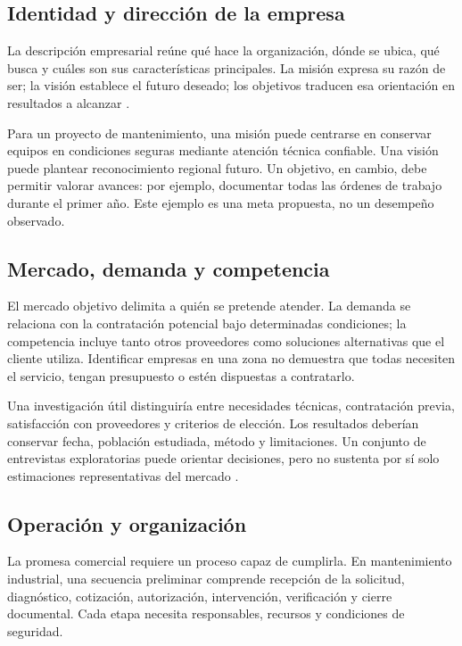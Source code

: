 {\subsection{Identidad y dirección de la empresa}

La descripción empresarial reúne qué hace la organización, dónde se ubica, qué busca y cuáles son sus características principales. La misión expresa su razón de ser; la visión establece el futuro deseado; los objetivos traducen esa orientación en resultados a alcanzar \citep{planNegociosGlosario2024}.

Para un proyecto de mantenimiento, una misión puede centrarse en conservar equipos en condiciones seguras mediante atención técnica confiable. Una visión puede plantear reconocimiento regional futuro. Un objetivo, en cambio, debe permitir valorar avances: por ejemplo, documentar todas las órdenes de trabajo durante el primer año. Este ejemplo es una meta propuesta, no un desempeño observado.

\subsection{Mercado, demanda y competencia}

El mercado objetivo delimita a quién se pretende atender. La demanda se relaciona con la contratación potencial bajo determinadas condiciones; la competencia incluye tanto otros proveedores como soluciones alternativas que el cliente utiliza. Identificar empresas en una zona no demuestra que todas necesiten el servicio, tengan presupuesto o estén dispuestas a contratarlo.

Una investigación útil distinguiría entre necesidades técnicas, contratación previa, satisfacción con proveedores y criterios de elección. Los resultados deberían conservar fecha, población estudiada, método y limitaciones. Un conjunto de entrevistas exploratorias puede orientar decisiones, pero no sustenta por sí solo estimaciones representativas del mercado \citep{albrechtMarketing2023}.

\subsection{Operación y organización}

La promesa comercial requiere un proceso capaz de cumplirla. En mantenimiento industrial, una secuencia preliminar comprende recepción de la solicitud, diagnóstico, cotización, autorización, intervención, verificación y cierre documental. Cada etapa necesita responsables, recursos y condiciones de seguridad.

}
